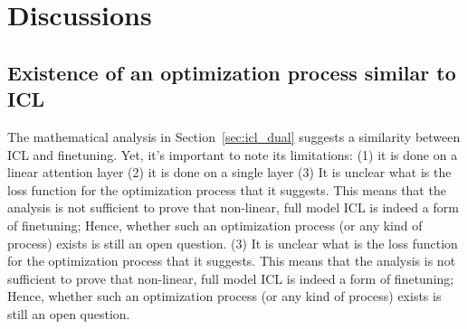 \documentclass[11pt]{article}
\begin{document}



\section{Discussions}
\subsection{Existence of an optimization process similar to ICL}
The mathematical analysis in Section~\ref{sec:icl_dual} suggests a similarity between ICL and finetuning.
Yet, it's important to note its limitations: (1) it is done on a linear attention layer (2) it is done on a single layer
(3) It is unclear what is the loss function for the optimization process that it suggests.
This means that the analysis is not sufficient to prove that non-linear, full model ICL is indeed a form of finetuning;
Hence, whether such an optimization process (or any kind of process) exists is still an open question.
(3) It is unclear what is the loss function for the optimization process that it suggests.
This means that the analysis is not sufficient to prove that non-linear, full model ICL is indeed a form of finetuning;
Hence, whether such an optimization process (or any kind of process) exists is still an open question.
\end{document}
